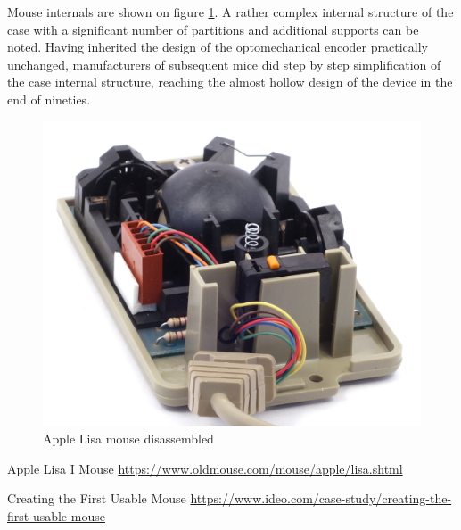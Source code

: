 \documentclass[11pt, a4paper]{article}
\begin{document}
Mouse internals are shown on figure \ref{fig:AppleLisaInside}. A rather complex internal structure of the case with a significant number of partitions and additional supports can be noted. Having inherited the design of the optomechanical encoder practically unchanged, manufacturers of subsequent mice did step by step simplification of the case internal structure, reaching the almost hollow design of the device in the end of nineties.

 \begin{figure}[h]
    \centering
    \includegraphics[scale=0.6]{1983_apple_lisa_mouse/appleraz_60.jpg}
    \caption{Apple Lisa mouse disassembled}
    \label{fig:AppleLisaInside}
\end{figure}

\begin{thebibliography}{9}
 Apple Lisa I Mouse \url{https://www.oldmouse.com/mouse/apple/lisa.shtml}

 Creating the First Usable Mouse \url{https://www.ideo.com/case-study/creating-the-first-usable-mouse}
\end{thebibliography}
\end{document}
